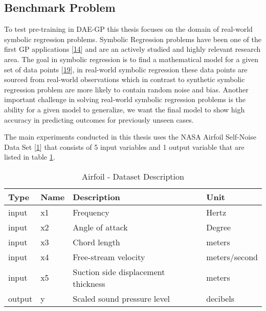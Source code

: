 \documentclass[
  11pt,
]{article}
\begin{document}
\hypertarget{benchmark-problem}{%
\subsection{Benchmark Problem}\label{benchmark-problem}}

To test pre-training in DAE-GP this thesis focuses on the domain of real-world symbolic regression problems. Symbolic Regression problems have been one of the first GP applications {[}\protect\hyperlink{ref-Koza1993GeneticP}{14}{]} and are an actively studied and highly relevant research area. The goal in symbolic regression is to find a mathematical model for a given set of data points {[}\protect\hyperlink{ref-10.1007ux2f978-3-540-24621-3_22}{19}{]}, in real-world symbolic regression these data points are sourced from real-world observations which in contrast to synthetic symbolic regression problem are more likely to contain random noise and bias. Another important challenge in solving real-world symbolic regression problems is the ability for a given model to generalize, we want the final model to show high accuracy in predicting outcomes for previously unseen cases.

The main experiments conducted in this thesis uses the NASA Airfoil Self-Noise Data Set {[}\protect\hyperlink{ref-AIRFOIL_DATASET}{1}{]} that consists of 5 input variables and 1 output variable that are listed in table \ref{tab:airfoil-dataset-description}.

\begin{table}[!h]

\caption{\label{tab:airfoil-dataset-description}Airfoil - Dataset Description}
\centering
\begin{tabular}[t]{l|l|l|l}
\hline
\textbf{Type} & \textbf{Name} & \textbf{Description} & \textbf{Unit}\\
\hline
input & x1 & Frequency & Hertz\\
\hline
input & x2 & Angle of attack & Degree\\
\hline
input & x3 & Chord length & meters\\
\hline
input & x4 & Free-stream velocity & meters/second\\
\hline
input & x5 & Suction side displacement thickness & meters\\
\hline
output & y & Scaled sound pressure level & decibels\\
\hline
\end{tabular}
\end{table}
\end{document}
